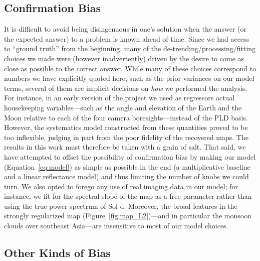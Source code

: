 \documentclass[modern]{aastex62}
\begin{document}
\subsection{Confirmation Bias}
\label{sec:confirmation}

It is difficult to avoid being disingenuous in one's solution
when the answer (or the expected answer)
to a problem is known ahead of time. Since we had access to 
``ground truth'' from the beginning, many of the de-trending/processing/fitting
choices we made were (however inadvertently) driven by the desire to
come as close as possible to the correct answer. While many of these choices
correspond to numbers we have explicitly quoted here, such as the prior
variances on our model terms, several of them are implicit decisions on
\emph{how} we performed the analysis. For instance, in an early version of 
the project we used as regressors actual \TESS housekeeping variables---such as the angle 
and elevation of the Earth and the Moon relative to each of the four camera 
boresights---instead of the PLD basis. However, the systematics model constructed from these quantities
proved to be too inflexible, judging in part from the poor fidelity of the recovered
maps. The results in this work
must therefore be taken with a grain of salt. That said, we have attempted to
offset the possibility of confirmation bias by making our model
(Equation~\ref{eq:model}) as simple as possible in the end (a multiplicative baseline
and a linear reflectance model) and thus limiting
the number of knobs we could turn. We also opted to forego any use of 
real imaging data in our model; for instance, we fit for the spectral
slope of the map as a free parameter rather than using the true power spectrum 
of Sol d. Moreover, the broad features in the strongly
regularized map (Figure~\ref{fig:map_L2})---and in particular the monsoon clouds
over southeast Asia---are insensitive to most of our model choices.

\subsection{Other Kinds of Bias}
\label{sec:bias}
\end{document}
